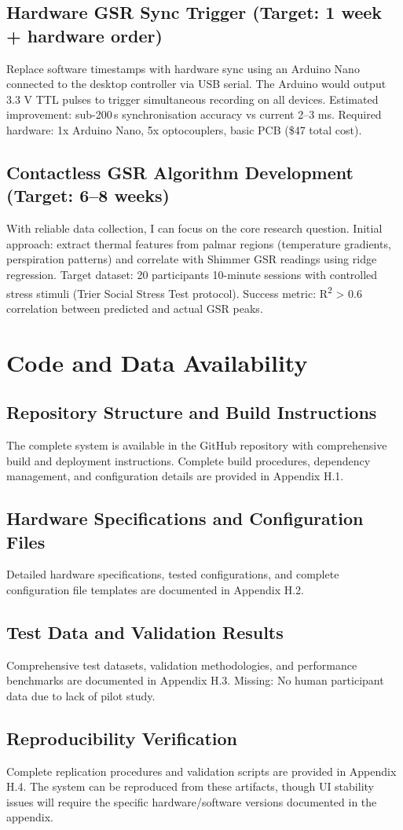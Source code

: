 \subsection{Hardware GSR Sync Trigger (Target: 1 week + hardware order)}
Replace software timestamps with hardware sync using an Arduino Nano connected to the desktop controller via USB serial. The Arduino would output 3.3 V TTL pulses to trigger simultaneous recording on all devices. Estimated improvement: sub-200\,\textmu s synchronisation accuracy vs current 2--3 ms. Required hardware: 1x Arduino Nano, 5x optocouplers, basic PCB (\$47 total cost).
\subsection{Contactless GSR Algorithm Development (Target: 6--8 weeks)}
With reliable data collection, I can focus on the core research question. Initial approach: extract thermal features from palmar regions (temperature gradients, perspiration patterns) and correlate with Shimmer GSR readings using ridge regression. Target dataset: 20 participants \texttimes{} 10-minute sessions with controlled stress stimuli (Trier Social Stress Test protocol). Success metric: R\textsuperscript{2} \textgreater{} 0.6 correlation between predicted and actual GSR peaks.

\section{Code and Data Availability}

\subsection{Repository Structure and Build Instructions}
The complete system is available in the GitHub repository with comprehensive build and deployment instructions. Complete build procedures, dependency management, and configuration details are provided in Appendix H.1.
\subsection{Hardware Specifications and Configuration Files}
Detailed hardware specifications, tested configurations, and complete configuration file templates are documented in Appendix H.2.
\subsection{Test Data and Validation Results}
Comprehensive test datasets, validation methodologies, and performance benchmarks are documented in Appendix H.3. Missing: No human participant data due to lack of pilot study.
\subsection{Reproducibility Verification}
Complete replication procedures and validation scripts are provided in Appendix H.4. The system can be reproduced from these artifacts, though UI stability issues will require the specific hardware/software versions documented in the appendix.
